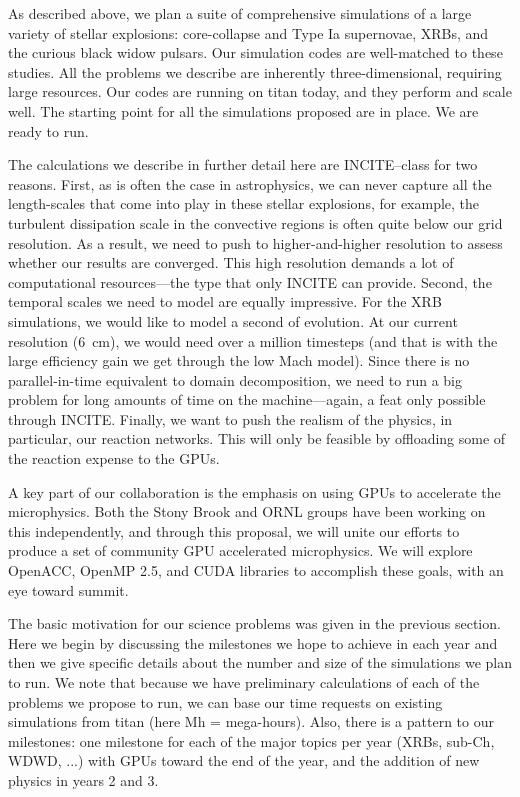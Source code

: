 As described above, we plan a suite of comprehensive simulations of a
large variety of stellar explosions: core-collapse and Type Ia
supernovae, XRBs, and the curious black widow pulsars.  Our simulation
codes are well-matched to these studies.  
All the problems we
describe are inherently three-dimensional, requiring large resources.
Our codes are running on titan today, and they perform and scale
well.  The starting point for all the simulations proposed are in
place.  We are ready to run.

The calculations we describe in further detail here are INCITE--class 
for two reasons.  First, as is often the case in astrophysics, we can
never capture all the length-scales that come into play in these
stellar explosions, for example, the turbulent dissipation scale in
the convective regions is often quite below our grid resolution.  As a
result, we need to push to higher-and-higher resolution to assess
whether our results are converged.  This high resolution demands a lot
of computational resources---the type that only INCITE can provide.
Second, the temporal scales we need to model are equally impressive.
For the XRB simulations, we would like to model a second of evolution.
At our current resolution (6~cm), we would need over a million
timesteps (and that is with the large efficiency gain we get through
the low Mach model).  Since there is no parallel-in-time equivalent to
domain decomposition, we need to run a big problem for long amounts of
time on the machine---again, a feat only possible through INCITE.
Finally, we want to push the realism of the physics, in particular,
our reaction networks.  This will only be feasible by offloading some
of the reaction expense to the GPUs.

A key part of our collaboration is the emphasis on using GPUs
to accelerate the microphysics.  Both the Stony Brook and ORNL
groups have been working on this independently, and through this
proposal, we will unite our efforts to produce a set of community
GPU accelerated microphysics.  We will explore OpenACC, OpenMP 2.5,
and CUDA libraries to accomplish these goals, with an eye toward
summit.

The basic motivation for our science problems was given in the
previous section.  Here we begin by discussing the milestones we hope
to achieve in each year and then we give specific details about the
number and size of the simulations we plan to run.  We note that because
we have preliminary calculations of each of the problems we propose to
run, we can base our time requests on existing simulations from titan
(here Mh = mega-hours).  Also, there is a pattern to our milestones:
one milestone for each of the major topics per year (XRBs, sub-Ch,
WDWD, ...) with GPUs toward the end of the year, and the addition of 
new physics in years 2 and 3.  

